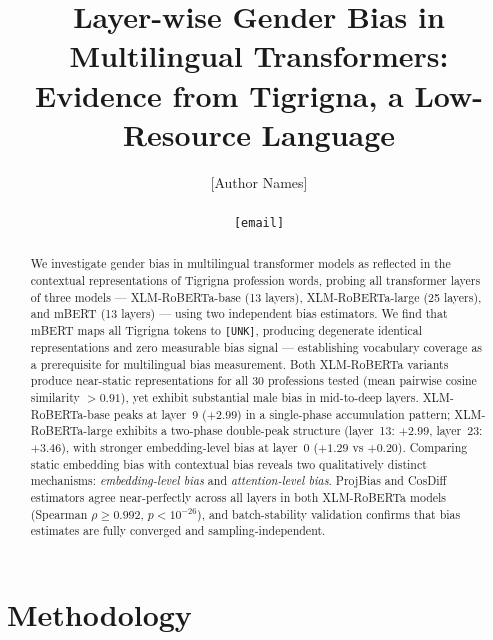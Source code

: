 \documentclass[11pt,a4paper]{article}
\begin{document}

\title{\textbf{Layer-wise Gender Bias in Multilingual Transformers:\\
       Evidence from Tigrigna, a Low-Resource Language}}

\author{[Author Names] \\ [Institution] \\ \texttt{[email]}}
\date{}
\maketitle

\begin{abstract}
We investigate gender bias in multilingual transformer models as reflected in
the contextual representations of Tigrigna profession words, probing all
transformer layers of three models — XLM-RoBERTa-base (13 layers),
XLM-RoBERTa-large (25 layers), and mBERT (13 layers) — using two independent
bias estimators. We find that mBERT maps all Tigrigna tokens to \texttt{[UNK]},
producing degenerate identical representations and zero measurable bias signal —
establishing vocabulary coverage as a prerequisite for multilingual bias
measurement. Both XLM-RoBERTa variants produce near-static representations for
all 30 professions tested (mean pairwise cosine similarity $>0.91$), yet exhibit
substantial male bias in mid-to-deep layers. XLM-RoBERTa-base peaks at
layer~9 ($+2.99$) in a single-phase accumulation pattern; XLM-RoBERTa-large
exhibits a two-phase double-peak structure (layer~13: $+2.99$, layer~23: $+3.46$),
with stronger embedding-level bias at layer~0 ($+1.29$ vs $+0.20$). Comparing
static embedding bias with contextual bias reveals two qualitatively distinct
mechanisms: \emph{embedding-level bias} and \emph{attention-level bias}.
ProjBias and CosDiff estimators agree near-perfectly across all layers in both
XLM-RoBERTa models (Spearman $\rho \geq 0.992$, $p < 10^{-26}$), and
batch-stability validation confirms that bias estimates are fully converged
and sampling-independent.
\end{abstract}

\section{Methodology}
\end{document}

